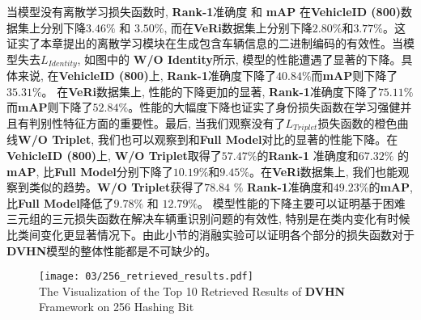   当模型没有离散学习损失函数时, \textbf{Rank-1}准确度 和 \textbf{mAP} 在\textbf{VehicleID (800)}数据集上分别下降$3.46 \%$ 和 $3.50 \%$, 而在\textbf{VeRi}数据集上分别下降$2.80 \%$和$3.77 \%$。这证实了本章提出的离散学习模块在生成包含车辆信息的二进制编码的有效性。当模型失去$L_{Identity}$, 如图中的 \textbf{W/O Identity}所示, 模型的性能遭遇了显著的下降。具体来说, 在\textbf{VehicleID (800)}上, \textbf{Rank-1}准确度下降了$40.84 \%$而\textbf{mAP}则下降了$35.31 \%$。 在\textbf{VeRi}数据集上, 性能的下降更加的显著, \textbf{Rank-1}准确度下降了$75.11 \%$而\textbf{mAP}则下降了$52.84 \%$。性能的大幅度下降也证实了身份损失函数在学习强健并且有判别性特征方面的重要性。最后, 当我们观察没有了$L_{Triplet}$损失函数的橙色曲线\textbf{W/O Triplet}, 我们也可以观察到和\textbf{Full Model}对比的显著的性能下降。在\textbf{VehicleID (800)}上, \textbf{W/O Triplet}取得了$57.47 \%$的\textbf{Rank-1} 准确度和$67.32 \%$ 的\textbf{mAP}, 比\textbf{Full Model}分别下降了$10.19 \%$和$9.45 \%$。在\textbf{VeRi}数据集上, 我们也能观察到类似的趋势。\textbf{W/O Triplet}获得了$78.84$ \% \textbf{Rank-1}准确度和$49.23 \%$的\textbf{mAP}, 比\textbf{Full Model}降低了$9.78 \%$ 和 $12.79\%$。 模型性能的下降主要可以证明基于困难三元组的三元损失函数在解决车辆重识别问题的有效性, 特别是在类内变化有时候比类间变化更显著情况下。由此小节的消融实验可以证明各个部分的损失函数对于\textbf{DVHN}模型的整体性能都是不可缺少的。 
\begin{figure}[!htp]
    \centering
    \texttt{[image: 03/256\_retrieved\_results.pdf]} \\
      {The Visualization of the Top 10 Retrieved Results of \textbf{DVHN} Framework on 256 Hashing Bit}
   \label{fig:retrieval256}
\end{figure}
